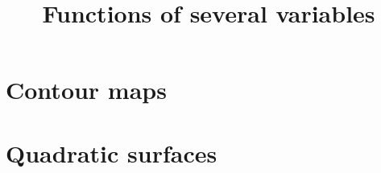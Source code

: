\documentclass{ximera}
\title[Dig-In:]{Functions of several variables}
\begin{document}
\begin{abstract}
\end{abstract}
\maketitle




\section{Contour maps}


\section{Quadratic surfaces}
\end{document}
